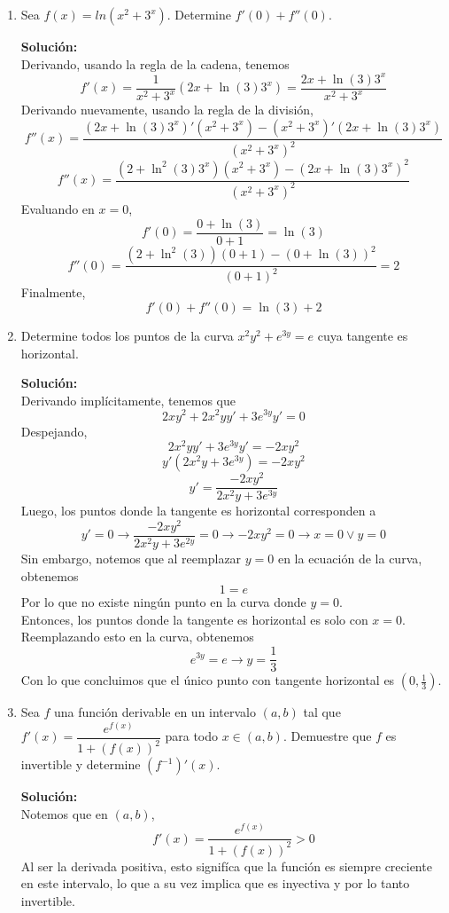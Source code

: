 \documentclass[12pt]{article}
\newenvironment{solucion}
{\begin{mdframed}[backgroundcolor=black!10]
		{\bf Solución:}\\
	}
	{
	\end{mdframed}
}
\newenvironment{preguntas}
{\begin{enumerate}\itemsep12pt
	}
	{
	\end{enumerate}
}
\newcommand{\ra}{\rightarrow}
\begin{document}
\begin{preguntas}
\item Sea $f(x) = ln(x^2+3^x)$. Determine $f'(0) + f''(0)$.
\begin{solucion}
Derivando, usando la regla de la cadena, tenemos
$$f'(x) = \dfrac{1}{x^2+3^x}(2x + \ln(3)3^x) = \dfrac{2x + \ln(3)3^x}{x^2+3^x}$$
Derivando nuevamente, usando la regla de la división,
$$f''(x) = \dfrac{(2x + \ln(3)3^x)'(x^2+3^x) - (x^2+3^x)'(2x + \ln(3)3^x)}{(x^2+3^x)^2}$$
$$f''(x) = \dfrac{(2 + \ln^2(3)3^x)(x^2+3^x) - (2x + \ln(3)3^x)^2}{(x^2+3^x)^2}$$
Evaluando en $x=0$,
$$f'(0) = \dfrac{0 + \ln(3)}{0+1} = \ln(3)$$
$$f''(0) = \dfrac{(2+\ln^2(3))(0+1) - (0+\ln(3))^2}{(0+1)^2} = 2$$
Finalmente,
$$f'(0) + f''(0) = \ln(3) + 2$$
\end{solucion}
\item Determine todos los puntos de la curva $x^2y^2 + e^{3y} = e$ cuya tangente es horizontal.
\begin{solucion}
Derivando implícitamente, tenemos que
$$2xy^2 + 2x^2yy' + 3e^{3y}y' = 0$$
Despejando,
$$2x^2yy' + 3e^{3y}y' = -2xy^2$$
$$y'(2x^2y + 3e^{3y}) = -2xy^2$$
$$y' = \dfrac{-2xy^2}{2x^2y + 3e^{3y}}$$
Luego, los puntos donde la tangente es horizontal corresponden a
$$y'= 0 \ra \dfrac{-2xy^2}{2x^2y + 3e^{2y}} = 0 \ra -2xy^2 = 0 \ra x = 0 \vee y = 0$$
Sin embargo, notemos que al reemplazar $y=0$ en la ecuación de la curva, obtenemos
$$1 = e$$
Por lo que no existe ningún punto en la curva donde $y=0$.\\

Entonces, los puntos donde la tangente es horizontal es solo con $x=0$. Reemplazando esto en la curva, obtenemos
$$e^{3y} = e \ra y = \dfrac{1}{3}$$
Con lo que concluimos que el único punto con tangente horizontal es $(0,\frac{1}{3})$.
\end{solucion}
\item Sea $f$ una función derivable en un intervalo $(a,b)$ tal que $f'(x) = \dfrac{e^{f(x)}}{1+(f(x))^2}$ para todo $x \in (a,b)$. Demuestre que $f$ es invertible y determine $(f^{-1})'(x)$.
\begin{solucion}
Notemos que en $(a,b)$,
$$f'(x) = \dfrac{e^{f(x)}}{1+(f(x))^2} > 0$$
Al ser la derivada positiva, esto signifíca que la función es siempre creciente en este intervalo, lo que a su vez implica que es inyectiva y por lo tanto invertible.\\


\end{solucion}
\end{preguntas}
\end{document}
